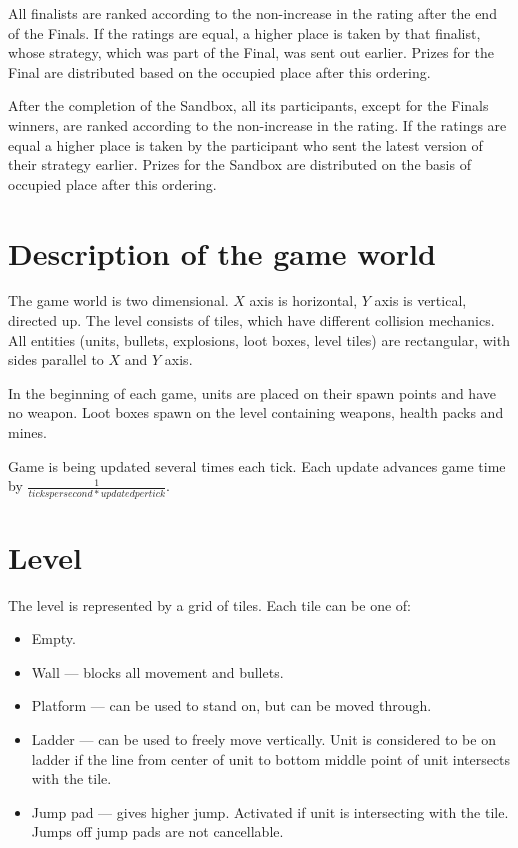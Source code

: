 All finalists are ranked according to the non-increase in the rating after the end of the Finals. If the ratings are equal, a higher place is taken by that finalist, whose strategy, which was part of the Final, was sent out earlier. Prizes for the Final are distributed based on the occupied place after this
ordering.

After the completion of the Sandbox, all its participants, except for the Finals winners, are ranked according to the non-increase in the rating. If the ratings are equal 
a higher place is taken by the participant who sent the latest version of their strategy earlier. Prizes for the Sandbox are distributed on the basis of
occupied place after this ordering.

\section{Description of the game world}

The game world is two dimensional.
$X$ axis is horizontal, $Y$ axis is vertical, directed up.
The level consists of tiles, which have different collision mechanics.
All entities (units, bullets, explosions, loot boxes, level tiles) are rectangular, with sides parallel to $X$ and $Y$ axis.

In the beginning of each game, units are placed on their spawn points and have no weapon.
Loot boxes spawn on the level containing weapons, health packs and mines.

Game is being updated several times each tick.
Each update advances game time by $\frac{1}{ticks per second * updated per tick}$.

\section{Level}

The level is represented by a grid of tiles. Each tile can be one of:
\begin{itemize}
      \item Empty.
      \item Wall --- blocks all movement and bullets.
      \item Platform --- can be used to stand on, but can be moved through.
      \item Ladder --- can be used to freely move vertically.
            Unit is considered to be on ladder if the line from center of unit to bottom middle point of unit intersects with the tile.
      \item Jump pad --- gives higher jump. Activated if unit is intersecting with the tile.
            Jumps off jump pads are not cancellable.
\end{itemize}


